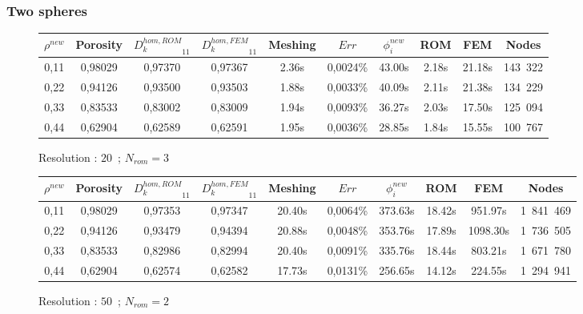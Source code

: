 {%
\subsubsection{Two spheres}

\begin{figure}[H]%
%
\begin{center}
\begin{tabular}{|c|c||c|c||c|c||c|c||c||c|}
\hline
\rowcolor{lightgray} $\rho^{new}$&Porosity&${D_k^{hom,ROM}}_{11}$&${D_k^{hom,FEM}}_{11}$&Meshing&$Err$&$\phi_i^{new}$&ROM&FEM&Nodes\\
\hline
0,11&0,98029&0,97370&0,97367&2.36s&0,0024\%&43.00s&2.18s&21.18s&143\ 322\\
\hline
0,22&0,94126&0,93500&0,93503&1.88s&0,0033\%&40.09s&2.11s&21.38s&134\ 229\\
\hline
0,33&0,83533&0,83002&0,83009&1.94s&0,0093\%&36.27s&2.03s&17.50s&125\ 094\\
\hline
0,44&0,62904&0,62589&0,62591&1.95s&0,0036\%&28.85s&1.84s&15.55s&100\ 767\\
\hline
\end{tabular}
\end{center}
\caption{Resolution : $20$\ ; $N_{rom}=3$}
%
\end{figure}

\begin{figure}[H]%
%
\begin{center}
\begin{tabular}{|c|c||c|c||c|c||c|c||c||c|}
\hline
\rowcolor{lightgray} $\rho^{new}$&Porosity&${D_k^{hom,ROM}}_{11}$&${D_k^{hom,FEM}}_{11}$&Meshing&$Err$&$\phi_i^{new}$&ROM&FEM&Nodes\\
\hline
0,11&0,98029&0,97353&0,97347&20.40s&0,0064\%&373.63s&18.42s&951.97s&1\ 841\ 469\\
\hline
0,22&0,94126&0,93479&0,94394&20.88s&0,0048\%&353.76s&17.89s&1098.30s&1\ 736\ 505\\
\hline
0,33&0,83533&0,82986&0,82994&20.40s&0,0091\%&335.76s&18.44s&803.21s&1\ 671\ 780\\
\hline
0,44&0,62904&0,62574&0,62582&17.73s&0,0131\%&256.65s&14.12s&224.55s&1\ 294\ 941\\
\hline
\end{tabular}
\end{center}
\caption{Resolution : $50$\ ; $N_{rom}=2$}
%
\end{figure}

}
